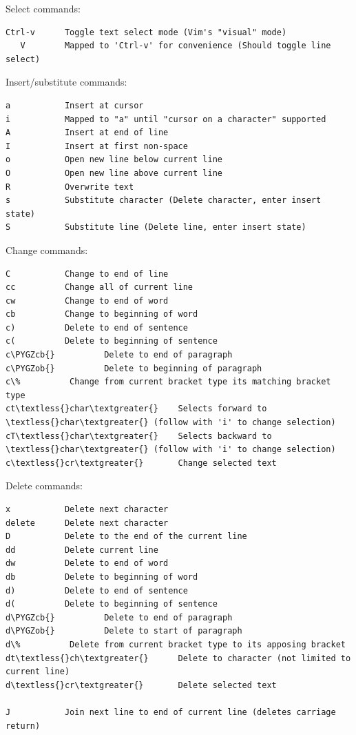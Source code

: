 \documentclass[a4paper,10pt,english]{sphinxmanual}
\def\PYGZob{\char`\{}
\def\PYGZcb{\char`\}}
\begin{document}
Select commands:

\begin{Verbatim}[commandchars=\\\{\}]
Ctrl-v      Toggle text select mode (Vim's "visual" mode)
   V        Mapped to 'Ctrl-v' for convenience (Should toggle line select)
\end{Verbatim}

Insert/substitute commands:

\begin{Verbatim}[commandchars=\\\{\}]
a           Insert at cursor
i           Mapped to "a" until "cursor on a character" supported
A           Insert at end of line
I           Insert at first non-space
o           Open new line below current line
O           Open new line above current line
R           Overwrite text
s           Substitute character (Delete character, enter insert state)
S           Substitute line (Delete line, enter insert state)
\end{Verbatim}

Change commands:

\begin{Verbatim}[commandchars=\\\{\}]
C           Change to end of line
cc          Change all of current line
cw          Change to end of word
cb          Change to beginning of word
c)          Delete to end of sentence
c(          Delete to beginning of sentence
c\PYGZcb{}          Delete to end of paragraph
c\PYGZob{}          Delete to beginning of paragraph
c\%          Change from current bracket type its matching bracket type
ct\textless{}char\textgreater{}    Selects forward to \textless{}char\textgreater{} (follow with 'i' to change selection)
cT\textless{}char\textgreater{}    Selects backward to \textless{}char\textgreater{} (follow with 'i' to change selection)
c\textless{}cr\textgreater{}       Change selected text
\end{Verbatim}

Delete commands:

\begin{Verbatim}[commandchars=\\\{\}]
x           Delete next character
delete      Delete next character
D           Delete to the end of the current line
dd          Delete current line
dw          Delete to end of word
db          Delete to beginning of word
d)          Delete to end of sentence
d(          Delete to beginning of sentence
d\PYGZcb{}          Delete to end of paragraph
d\PYGZob{}          Delete to start of paragraph
d\%          Delete from current bracket type to its apposing bracket
dt\textless{}ch\textgreater{}      Delete to character (not limited to current line)
d\textless{}cr\textgreater{}       Delete selected text

J           Join next line to end of current line (deletes carriage return)
\end{Verbatim}
\end{document}

